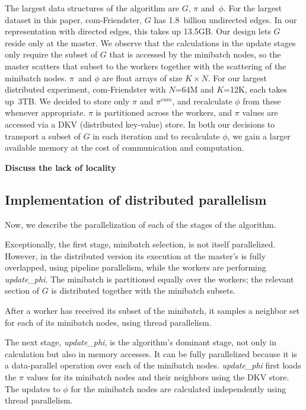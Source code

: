 The largest data structures of the algorithm are $G$, $\pi$ and~$\phi$.
For the largest dataset in this paper, com-Friendster, $G$ has 1.8~billion
undirected edges. In our representation with directed edges, this takes
up 13.5GB. Our design lets $G$ reside only at the master. We observe that
the calculations in the update stages only require the subset of $G$ that
is accessed by the minibatch nodes, so the master scatters that subset to
the workers together with the scattering of the minibatch nodes. $\pi$~and
$\phi$ are float arrays of size $K \times N$. For our largest distributed
experiment, com-Friendster with $N$=64M and $K$=12K, each takes up~3TB. We
decided to store only $\pi$ and $\pi^{sum}$, and recalculate $\phi$ from these
whenever appropriate. $\pi$ is partitioned across the workers, and $\pi$
values are accessed via a DKV (distributed key-value) store. In both our
decisions to transport a subset of $G$ in each iteration and to recalculate
$\phi$, we gain a larger available memory at the cost of communication and
computation.


{\Large\bf Discuss the lack of locality}


\subsection{Implementation of distributed parallelism}

Now, we describe the parallelization of each of the stages of the algorithm.

Exceptionally, the first stage, minibatch selection, is not itself
parallelized. However, in the distributed version its execution at the
master's is fully overlapped, using pipeline parallelism, while the workers are
performing \textit{update\_phi}. The minibatch is partitioned equally over the
workers; the relevant section of $G$ is distributed together with the
minibatch subsets.

After a worker has received its subset of the minibatch, it samples a
neighbor set for each of its minibatch nodes, using thread parallelism.

The next stage, \textit{update\_phi}, is the algorithm's dominant stage, not
only in calculation but also in memory accesses. It can be fully parallelized
because it is a data-parallel operation over each of the minibatch nodes.
\textit{update\_phi} first loads the $\pi$ values for its minibatch nodes and
their neighbors using the DKV store. The updates to $\phi$ for the minibatch
nodes are calculated independently using thread parallelism.


